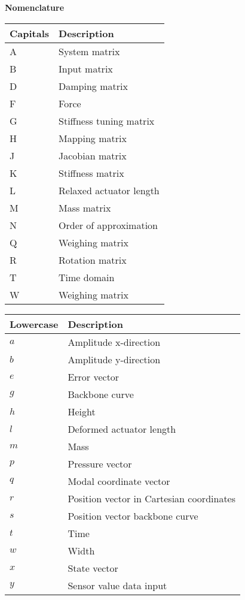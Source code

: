 \begin{spacing}{0.9}

\Large{\textbf{Nomenclature}}

\begin{multicols}{2}
\begin{table}[H]
\centering
    \begin{tabular}{p{1.7cm} p{4.8cm}} \hline
    \textbf{Capitals}    &   \textbf{Description }\\ \hline
    A      &  System matrix \\
    B     &  Input matrix \\
    D     &  Damping matrix \\
    F     & Force \\
    G     & Stiffness tuning matrix \\
    H     &  Mapping matrix \\
    J     &  Jacobian matrix \\
    K     &  Stiffness matrix \\
    L     &  Relaxed actuator length \\
    M     &  Mass matrix \\
    N     & Order of approximation \\
    Q     & Weighing matrix \\
    R     & Rotation matrix \\
    T     & Time domain \\
    W     & Weighing matrix \\ \hline
    \end{tabular}
\end{table}




\begin{table}[H]
\centering
    \begin{tabular}{p{1.7cm} p{4.8cm}} \hline
    \textbf{Lowercase}    &   \textbf{Description }\\ \hline
     $a$     & Amplitude x-direction \\
     $b$     & Amplitude y-direction \\
     $e$     & Error vector \\
     $g$     & Backbone curve \\
     $h$     & Height \\
     $l$     & Deformed actuator length \\
     $m$     & Mass \\
     $p$     & Pressure vector \\
     $q$     & Modal coordinate vector \\
     $r$     & Position vector in Cartesian coordinates \\
     $s$     & Position vector backbone curve \\
     $t$     & Time \\
     $w$     & Width \\
     $x$     & State vector \\
     $y$     & Sensor value data input \\ \hline
    \end{tabular}
\end{table}




\end{multicols}
\end{spacing}
